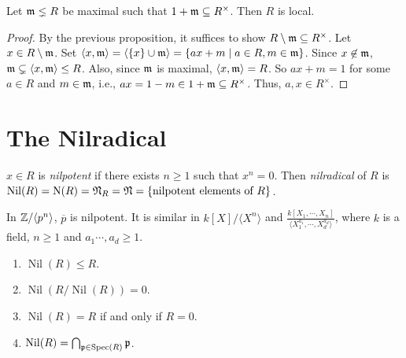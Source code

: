 \begin{proposition}
    Let $\mathfrak{m} \lneq R$ be maximal such that $1 + \mathfrak{m} \subseteq R^\times$. Then $R$ is local.
\end{proposition}

\begin{proof}
    By the previous proposition, it suffices to show $R \setminus \mathfrak{m} \subseteq R^\times$. Let $x \in R \setminus \mathfrak{m}$. Set $\langle x, \mathfrak{m} \rangle = \langle \{x\} \cup \mathfrak{m} \rangle = \{ax+m \mid a \in R, m \in \mathfrak{m}\}$. Since $x \not \in \mathfrak{m}$, $\mathfrak{m} \subsetneq \langle x, \mathfrak{m} \rangle \leq R$. Also, since $\mathfrak{m}$ is maximal, $\langle x,\mathfrak{m} \rangle = R$. So $ax + m = 1$ for some $a \in R$ and $m \in \mathfrak{m}$, i.e., $ax = 1-m \in 1 + \mathfrak{m} \subseteq R^\times$. Thus, $a,x \in R^\times$.
\end{proof}

\section*{The Nilradical}

\begin{definition}
    $x \in R$ is \emph{nilpotent} if there exists $n \geq 1$ such that $x^n = 0$. Then \emph{nilradical} of $R$ is $\operatorname{Nil}(R) = \operatorname{N}(R) = \mathfrak{N}_R = \mathfrak{N} = \{\text{nilpotent elements of }R\}$.
\end{definition}

\begin{example}
    In $\mathbb{Z}/\langle p^n \rangle$, $\overbar p$ is nilpotent. It is similar in $k[X]/\langle X^n \rangle$ and $\frac{k[X_1,\cdots,X_n]}{\langle X_1^{a_1},\cdots,X_d^{a_d}\rangle}$, where $k$ is a field, $n \geq 1$ and $a_1\cdots,a_d \geq 1$.
\end{example}

\begin{proposition}
    \begin{enumerate}
        \item $\operatorname{Nil}(R) \leq R$.
        \item $\operatorname{Nil}(R/\operatorname{Nil}(R)) = 0$.
        \item $\operatorname{Nil}(R) = R$ if and only if $R = 0$.
        \item $\operatorname{Nil}(R) = \bigcap_{\mathfrak{p} \in \operatorname{Spec}(R)}\mathfrak{p}$.
    \end{enumerate}
\end{proposition}

